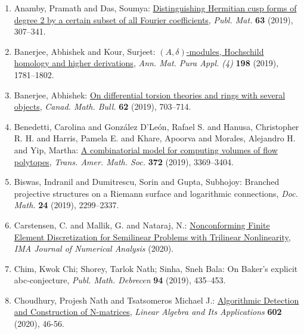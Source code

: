 \begin{enumerate}[resume, leftmargin=27pt]

	\item Anamby, Pramath and Das, Soumya: \href{https://doi.org/10.5565/PUBLMAT6311911}{Distinguishing
			      {H}ermitian cusp forms of degree 2 by a certain subset of all {F}ourier coefficients},
	      \emph{Publ. Mat.} {\bf 63} (2019), 307--341.


	\item Banerjee, Abhishek and Kour, Surjeet: \href{https://doi.org/10.1007/s10231-019-00844-x}{{$(A,\delta)$}-modules, {H}ochschild homology and higher
		      derivations}, \emph{Ann. Mat. Pura Appl. (4)} {\bf 198} (2019), 1781--1802.

	\item Banerjee, Abhishek: \href{https://doi.org/10.4153/s0008439518000656}{On differential torsion theories and rings with
		      several objects}, \emph{Canad. Math. Bull.} {\bf 62} (2019), 703--714.

	\item Benedetti, Carolina and Gonz\'{a}lez D'Le\'{o}n, Rafael S. and Hanusa,
	      Christopher R. H. and Harris, Pamela E. and Khare, Apoorva and
	      Morales, Alejandro H. and Yip, Martha: \href{https://doi.org/10.1090/tran/7743}{A combinatorial model for computing volumes of flow polytopes}, \emph{Trans. Amer. Math. Soc.} {\bf 372} (2019), 3369--3404.

	\item Biswas, Indranil and Dumitrescu, Sorin and Gupta, Subhojoy: Branched projective structures on a {R}iemann surface and
	      logarithmic connections, \emph{Doc. Math.} {\bf 24} (2019), 2299--2337.

	\item Carstensen, C. and Mallik, G. and Nataraj, N.: \href{https://doi.org/10.1093/imanum/drz071}{Nonconforming Finite Element Discretization for Semilinear Problems with Trilinear Nonlinearity}, \emph{IMA Journal of Numerical Analysis} {\bf } (2020).

	\item Chim, Kwok Chi; Shorey, Tarlok Nath; Sinha, Sneh Bala: On Baker's explicit abc-conjecture, \emph{Publ. Math. Debrecen} {\bf 94} (2019), 435–453.

	\item Choudhury, Projesh Nath and Tsatsomeros Michael J.: \href{https://doi.org/10.1016/j.laa.2020.04.028}{Algorithmic Detection and Construction of N-matrices}, \emph{Linear Algebra and Its Applications} {\bf 602} (2020), 46-56.


\end{enumerate}

